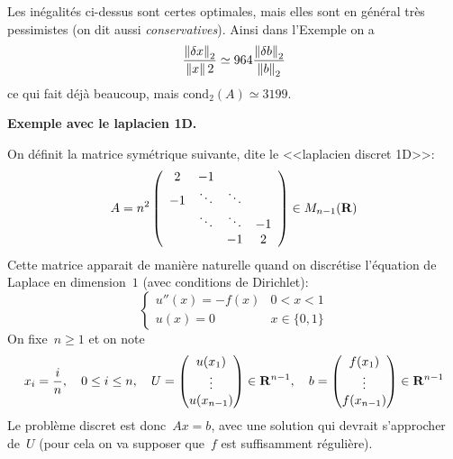 \begin{remark}
\label{rm:cond}
Les inégalités ci-dessus sont certes optimales, mais elles sont en général
très pessimistes (on dit aussi \emph{conservatives}). Ainsi dans
l'Exemple on a
\[
\frac{\left\|\delta x\right\|_{2}}{\left\|x\right\|{2}} \simeq 964 \frac{\left\|\delta
b\right\|_{2}}{\left\|b\right\|_{2}}
\]
ce qui fait déjà beaucoup, mais $\mathrm{cond}_2(A) \simeq 3199$.
\end{remark}

{\bf Exemple avec le laplacien 1D.}

On définit la matrice symétrique suivante, dite le <<laplacien discret 1D>>:
\begin{equation}
\label{eq:A}
A = n^2 \left(\begin{array}{cccc}
2 & -1 & &  \\
-1 & \ddots & \ddots & \\
  & \ddots & \ddots & -1 \\
 & & -1 & 2
\end{array}\right) \in M_{n-1}(\mathbf{R})
\end{equation}
Cette matrice apparait de manière naturelle quand on discrétise l'équation de
Laplace en dimension~$1$ (avec conditions de Dirichlet):
\begin{equation*}
	\begin{cases}
		u''(x)  = -f(x) & 0 < x < 1 \\
		u(x) = 0 & x\in\{0,1\}
\end{cases}
\end{equation*}
On fixe~$n\ge 1$ et on note
\[
	x_i = \frac{i}{n}, \quad 0 \leq i \leq n, \quad U = \begin{pmatrix}u(x_1)
		\\ \vdots \\ u(x_{n-1})\end{pmatrix} \in \mathbf{R}^{n-1}, \quad  b =
		\begin{pmatrix}f(x_1) \\ \vdots \\ f(x_{n-1})\end{pmatrix} \in \mathbf{R}^{n-1}
\]
Le problème discret est donc~$Ax=b$, avec une solution qui devrait
s'approcher de~$U$ (pour cela on va supposer que~$f$ est suffisamment
régulière).


